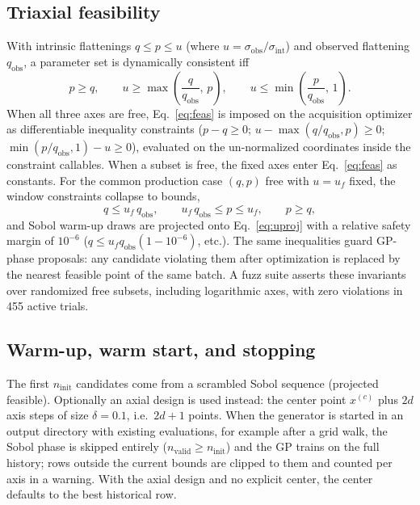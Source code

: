 \subsection{Triaxial feasibility}
\label{app:bayesopt:feas}
With intrinsic flattenings $q \le p \le u$ (where $u =
\sigma_\mathrm{obs}/\sigma_\mathrm{int}$) and observed flattening
$q_\mathrm{obs}$, a parameter set is dynamically consistent iff
\begin{equation}
  p \ge q, \qquad
  u \ge \max\!\left(\frac{q}{q_\mathrm{obs}},\, p\right), \qquad
  u \le \min\!\left(\frac{p}{q_\mathrm{obs}},\, 1\right).
  \label{eq:feas}
\end{equation}
When all three axes are free, Eq.~\eqref{eq:feas} is imposed on the
acquisition optimizer as differentiable inequality constraints
($p - q \ge 0$; $u - \max(q/q_\mathrm{obs}, p) \ge 0$;
$\min(p/q_\mathrm{obs}, 1) - u \ge 0$), evaluated on the un-normalized
coordinates inside the constraint callables. When a subset is free, the
fixed axes enter Eq.~\eqref{eq:feas} as constants. For the common
production case $(q, p)$ free with $u = u_f$ fixed, the window
constraints collapse to bounds,
\begin{equation}
  q \le u_f\, q_\mathrm{obs}, \qquad
  u_f\, q_\mathrm{obs} \le p \le u_f, \qquad p \ge q ,
  \label{eq:uproj}
\end{equation}
and Sobol warm-up draws are projected onto
Eq.~\eqref{eq:uproj} with a relative safety margin of $10^{-6}$
($q \le u_f q_\mathrm{obs} (1 - 10^{-6})$, etc.). The same inequalities
guard GP-phase proposals: any candidate violating them after
optimization is replaced by the nearest feasible point of the same
batch. A fuzz suite asserts these invariants over randomized free
subsets, including logarithmic axes, with zero violations in 455 active
trials.

\subsection{Warm-up, warm start, and stopping}
\label{app:bayesopt:warm}
The first $n_\mathrm{init}$ candidates come from a scrambled Sobol
sequence (projected feasible). Optionally an axial design is used
instead: the center point $x^{(c)}$ plus $2d$ axis steps of size
$\delta = 0.1$, i.e.\ $2d + 1$ points. When the generator is started in
an output directory with existing evaluations, for example after a grid
walk, the Sobol phase is skipped entirely ($n_\mathrm{valid} \ge
n_\mathrm{init}$) and the GP trains on the full history; rows outside
the current bounds are clipped to them and counted per axis in a
warning. With the axial design and no explicit center, the center
defaults to the best historical row.

